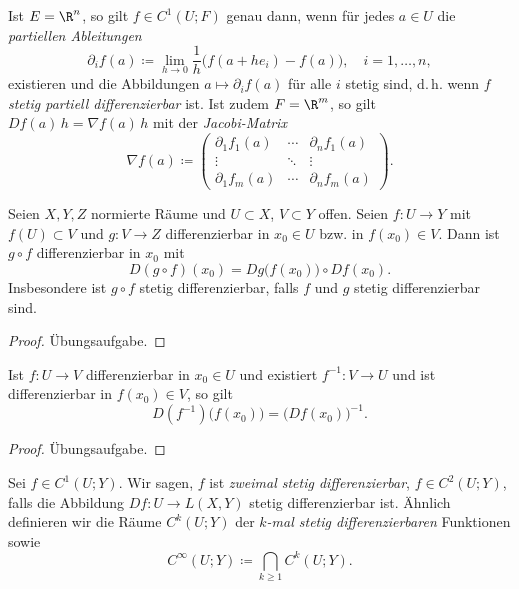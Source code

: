 \documentclass[11pt]{article}
\begin{document}
\begin{note}
  Ist $E = \R^n$, so gilt $f \in C^1(U; F)$ genau dann, wenn für jedes $a \in U$ die \emph{partiellen Ableitungen}
  \[ \partial_i f(a) \coloneqq \lim_{h \to 0} \frac{1}{h} \bigl(f(a + h e_i) - f(a)\bigr), \quad i = 1, \dots, n, \]
  existieren und die Abbildungen $a \mapsto \partial_i f(a)$ für alle $i$ stetig sind, d.\,h. wenn $f$ \textit{stetig partiell differenzierbar} ist.
  Ist zudem $F = \R^m$, so gilt $Df(a)\, h = \nabla f(a)\, h$ mit der \emph{Jacobi-Matrix}
  \[
    \nabla f(a) \coloneqq \begin{pmatrix} \partial_1 f_1(a) & \cdots & \partial_n f_1(a) \\ \vdots & \ddots & \vdots \\ \partial_1 f_m(a) & \cdots & \partial_n f_m(a) \end{pmatrix}.
  \]
\end{note}



\begin{theorem}[Kettenregel]\Theorem
  Seien $X, Y, Z$ normierte Räume und $U \subset X$, $V \subset Y$ offen. Seien $f\colon U \to Y$ mit $f(U) \subset V$ und $g\colon V \to Z$ differenzierbar in $x_0 \in U$ bzw. in $f(x_0) \in V$. Dann ist $g \circ f$ differenzierbar in $x_0$ mit
  \[ D(g \circ f)(x_0) = Dg\bigl(f(x_0)\bigr) \circ Df(x_0). \]
  Insbesondere ist $g \circ f$ stetig differenzierbar, falls $f$ und $g$ stetig differenzierbar sind.
\end{theorem}

\begin{proof}
  Übungsaufgabe.
\end{proof}

\begin{corollary}
  Ist $f\colon U \to V$ differenzierbar in $x_0 \in U$ und existiert $f^{-1}\colon V \to U$ und ist differenzierbar in $f(x_0) \in V$, so gilt
  \[ D(f^{-1})\bigl(f(x_0)\bigr) = \bigl(Df(x_0)\bigr)^{-1}. \]
\end{corollary}

\begin{proof}
  Übungsaufgabe.
\end{proof}

\begin{definition}\Theorem
  Sei $f \in C^1(U; Y)$. Wir sagen, $f$ ist \emph{zweimal stetig differenzierbar}, $f \in C^2(U; Y)$, falls die Abbildung $Df\colon U \to L(X, Y)$ stetig differenzierbar ist. Ähnlich definieren wir die Räume $C^k(U; Y)$ der \emph{$k$-mal stetig differenzierbaren} Funktionen sowie
  \[ C^\infty(U; Y) \coloneqq \bigcap_{k \ge 1} C^k(U; Y). \]
\end{definition}
\end{document}
